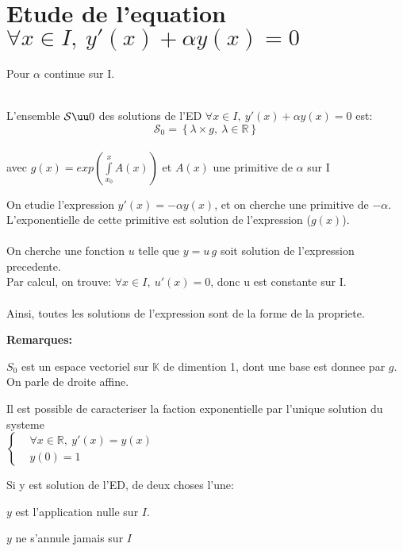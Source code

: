 \documentclass[12pt,twoside,a4paper]{article}
\begin{document}
	\section{Etude de l'equation $\forall x\in I,\ y'(x)+\alpha y(x)=0$}
	Pour $\alpha$ continue sur I.\\
	\\
	\begin{prop}
		L'ensemble $\mathcal{S}\uu0$ des solutions de l'ED $\forall x\in I,\ y'(x)+\alpha y(x)=0$ est:\\
		$$\mathcal{S}_0=\left\{\lambda\times g,\ \lambda\in\mathbb{R}\right\}$$\\
		avec $g(x)=exp\left(\int\limits^x_{x_0}A(x)\right)$ et $A(x)$ une primitive de $\alpha$ sur I
	\end{prop}
	\begin{preuve}
		On etudie l'expression $y'(x)=-\alpha y(x)$, et on cherche une primitive de $-\alpha$.\\
		L'exponentielle de cette primitive est solution de l'expression ($g(x)$).\\
		\\
		On cherche une fonction $u$ telle que $y=u\,g$ soit solution de l'expression precedente.\\
		Par calcul, on trouve: $\forall x\in I,\ u'(x)=0$, donc u est constante sur I.\\
		\\
		Ainsi, toutes les solutions de l'expression sont de la forme de la propriete.
	\end{preuve}
	\textbf{Remarques:}\\
	\begin{liste}
		\item $S_0$ est un espace vectoriel sur $\mathbb{K}$ de dimention 1, dont une base est donnee par $g$. On parle de droite affine.
		\item Il est possible de caracteriser la faction exponentielle par l'unique solution du systeme\\
			$\left\{\begin{aligned}&\forall x\in\mathbb{R},\ y'(x)=y(x)\\
				&y(0)=1\end{aligned}\right.$\\
		\item Si y est solution de l'ED, de deux choses l'une:
			\begin{liste}
				\item $y$ est l'application nulle sur $I$.
				\item $y$ ne s'annule jamais sur $I$ 
			\end{liste}
	\end{liste}
\end{document}
